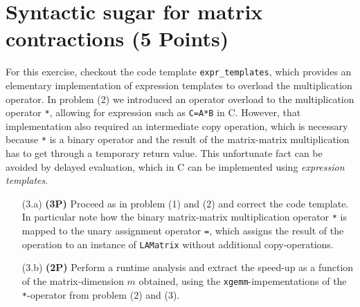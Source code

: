 \documentclass[a4paper, 12pt]{article}
\newcommand\Cpp{C\nolinebreak[4]\hspace{-.05em}\raisebox{.4ex}{\relsize{-3}{\textbf{++}}}}
\begin{document}
%
\section{Syntactic sugar for matrix contractions \textbf{(5 Points)}}
%
For this exercise, checkout the code template \texttt{expr\_templates}, which provides an elementary implementation of expression templates to overload the multiplication operator.
%
In problem (2) we introduced an operator overload to the multiplication operator \texttt{*}, allowing for expression such as \texttt{C=A*B} in \Cpp.
%
However, that implementation also required an intermediate copy operation, which is necessary because \texttt{*} is a binary operator and the result of the matrix-matrix multiplication has to get through a temporary return value.
%
This unfortunate fact can be avoided by delayed evaluation, which in \Cpp{} can be implemented using \textit{expression templates}.
%
\begin{itemize}
	\item[(3.a)] \textbf{(3P)}
	Proceed as in problem (1) and (2) and correct the code template.
	In particular note how the binary matrix-matrix multiplication operator \texttt{*} is mapped to the unary assignment operator \texttt{=}, which assigns the result of the operation to an instance of \texttt{LAMatrix} without additional copy-operations.
	\item[(3.b)] \textbf{(2P)}
	Perform a runtime analysis and extract the speed-up as a function of the matrix-dimension $m$ obtained, using the \texttt{xgemm}-impementations of the \texttt{*}-operator from problem (2) and (3).
\end{itemize}
%
\batchmode  %
\end{document}
